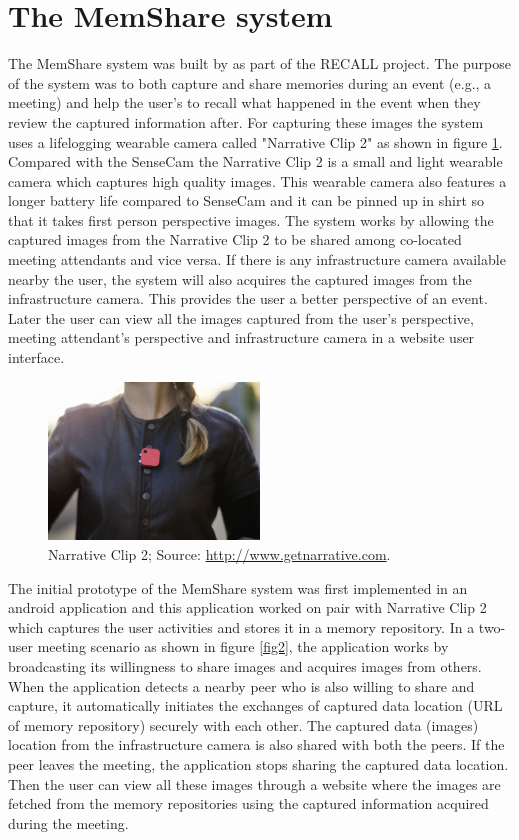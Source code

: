 \documentclass[mscthesis]{usiinfthesis}
\begin{document}
\section{The MemShare system}
\label{sec:bac}
The MemShare system was built by \citet{bexheti_secure_2016} as part of the RECALL project. The purpose of the system was to both capture and share memories during an event (e.g., a meeting) and help the user's to recall what happened in the event when they review the captured information after. For capturing these images the system uses a lifelogging wearable camera called "Narrative Clip 2" as shown in figure \ref{fig1}. Compared with the SenseCam the Narrative Clip 2 is a small and light wearable camera which captures high quality images. This wearable camera also features a longer battery life compared to SenseCam and it can be pinned up in shirt so that it takes first person perspective images. The system works by allowing the captured images from the Narrative Clip 2 to be shared among co-located meeting attendants and vice versa. If there is any infrastructure camera available nearby the user, the system will also acquires the captured images from the infrastructure camera. This provides the user a better perspective of an event. Later the user can view all the images captured from the user's perspective, meeting attendant's perspective and infrastructure camera in a website user interface.


\begin{figure}[!ht]
  \centering
  \includegraphics[width=0.5\textwidth]{Clip}
  \caption{Narrative Clip 2; Source: \url{http://www.getnarrative.com}.}
  \label{fig1}
\end{figure}

The initial prototype of the MemShare system was first implemented in an android application and this application worked on pair with Narrative Clip 2 which captures the user activities and stores it in a memory repository. In a two-user meeting scenario as shown in figure \ref{fig2}, the application works by broadcasting its willingness to share images and acquires images from others. When the application detects a nearby peer who is also willing to share and capture, it automatically initiates the exchanges of captured data location (URL of memory repository) securely with each other. The captured data (images) location from the infrastructure camera is also shared with both the peers. If the peer leaves the meeting, the application stops sharing the captured data location. Then the user can view all these images through a website where the images are fetched from the memory repositories using the captured information acquired during the meeting. 
\newline
\end{document}
